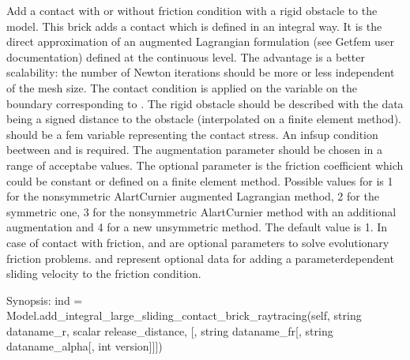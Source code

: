 \documentclass[a4paper,11pt,english]{sphinxmanual}
\begin{document}
\begin{fulllineitems}
\begin{fulllineitems}
Add a contact with or without friction condition with a rigid obstacle
to the model. This brick adds a contact which is defined
in an integral way. It is the direct approximation of an augmented
Lagrangian formulation (see Getfem user documentation) defined at the
continuous level. The advantage is a better scalability: the number of
Newton iterations should be more or less independent of the mesh size.
The contact condition is applied on the variable 
on the boundary corresponding to . The rigid obstacle should
be described with the data  being a signed distance to
the obstacle (interpolated on a finite element method).
 should be a fem variable representing the contact stress.
An inf\sphinxhyphen{}sup condition beetween  and  is required.
The augmentation parameter  should be chosen in a
range of acceptabe values.
The optional parameter  is the friction
coefficient which could be constant or defined on a finite element method.
Possible values for  is 1 for the non\sphinxhyphen{}symmetric Alart\sphinxhyphen{}Curnier
augmented Lagrangian method, 2 for the symmetric one, 3 for the
non\sphinxhyphen{}symmetric Alart\sphinxhyphen{}Curnier method with an additional augmentation
and 4 for a new unsymmetric method. The default value is 1.
In case of contact with friction,  and 
are optional parameters to solve evolutionary friction problems.
 and  represent optional data for adding
a parameter\sphinxhyphen{}dependent sliding velocity to the friction condition.

\end{fulllineitems}


\begin{fulllineitems}
\label{\detokenize{python/cmdref_Model:getfem.Model.add_integral_large_sliding_contact_brick_raytracing}}
Synopsis: ind = Model.add\_integral\_large\_sliding\_contact\_brick\_raytracing(self, string dataname\_r, scalar release\_distance, {[}, string dataname\_fr{[}, string dataname\_alpha{[}, int version{]}{]}{]})


\end{fulllineitems}
\end{fulllineitems}
\end{document}
